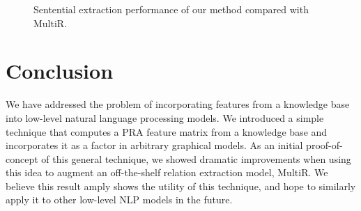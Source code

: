 \documentclass[11pt,a4paper]{article}
\begin{document}
\begin{figure}
  \centering
  \caption{Sentential extraction performance of our method compared with
  MultiR.}
  \label{fig:sentential-comparison}
\end{figure}

\section{Conclusion}

We have addressed the problem of incorporating features from a knowledge base
into low-level natural language processing models.  We introduced a simple
technique that computes a PRA feature matrix from a knowledge base and
incorporates it as a factor in arbitrary graphical models.  As an initial
proof-of-concept of this general technique, we showed dramatic improvements
when using this idea to augment an off-the-shelf relation extraction model,
MultiR.  We believe this result amply shows the utility of this technique, and
hope to similarly apply it to other low-level NLP models in the future.



\end{document}
